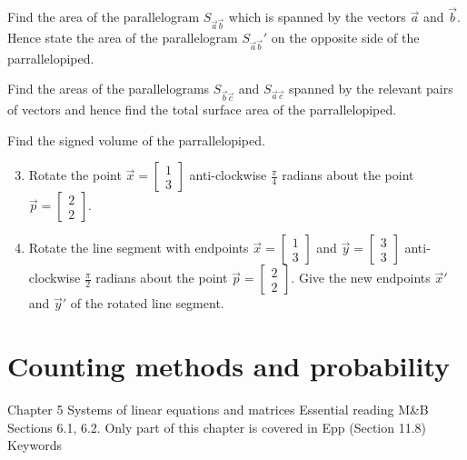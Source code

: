 \begin{enumerate}
	\renewcommand{\theenumi}{\roman{enumi})}
	\renewcommand{\labelenumi}{\theenumi}
	{\setlength\itemindent{3em} \item
		Find the area of the parallelogram $S_{\vec{a}\vec{b}}$ which is spanned by the vectors $\vec{a}$ and $\vec{b}$. Hence state the area of the parallelogram $S_{\vec{a}\vec{b}}'$ on the opposite side of the parrallelopiped.}
	{\setlength\itemindent{3em} \item
		Find the areas of the parallelograms $S_{\vec{b}\vec{c}}$ and $S_{\vec{a}\vec{c}}$ spanned by the relevant pairs of vectors and hence find the total surface area of the parrallelopiped.}
	{\setlength\itemindent{3em} \item
		Find the signed volume of the parrallelopiped.}
\end{enumerate}

\begin{enumerate}
	\setcounter{enumi}{2}
	\item
	Rotate the point $\vec{x}=\left[ \begin{array}{c} 1 \\ 3 \end{array}\right]$ anti-clockwise $\frac{\pi}{4}$ radians about the point $\vec{p}=\left[ \begin{array}{c} 2 \\ 2 \end{array}\right]$.
	\item
	Rotate the line segment with endpoints $\vec{x}=\left[ \begin{array}{c} 1 \\ 3 \end{array}\right]$ and $\vec{y}=\left[ \begin{array}{c} 3 \\ 3 \end{array}\right]$ anti-clockwise $\frac{\pi}{2}$ radians about the point $\vec{p}=\left[ \begin{array}{c} 2 \\ 2 \end{array}\right]$. Give the new endpoints $\vec{x}'$ and $\vec{y}'$ of the rotated line segment.
\end{enumerate}

\section{Counting methods and probability}

Chapter 5
Systems of linear equations and
matrices
Essential reading
M&B Sections 6.1, 6.2. Only part of this chapter is covered in Epp (Section 11.8)
Keywords




